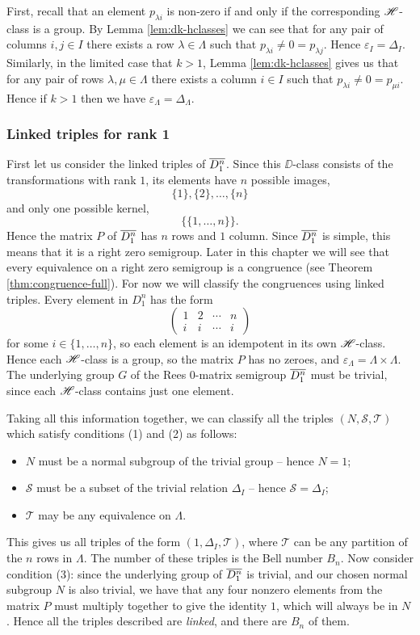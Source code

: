 First, recall that an element $p_{\lambda i}$ is non-zero if and only if the
corresponding $\mathrel{\mathscr{H}}$-class is a group.  By Lemma \ref{lem:dk-hclasses} we can see
that for any pair of columns $i,j \in I$ there exists a row
$\lambda \in \Lambda$ such that $p_{\lambda i} \neq 0 = p_{\lambda j}$.  Hence
$\varepsilon_I = \Delta_I$.  Similarly, in the limited case that $k>1$, Lemma
\ref{lem:dk-hclasses} gives us that for any pair of rows
$\lambda, \mu \in \Lambda$ there exists a column $i \in I$ such that
$p_{\lambda i} \neq 0 = p_{\mu i}$.  Hence if $k>1$ then we have
$\varepsilon_\Lambda = \Delta_\Lambda$.

\subsubsection{Linked triples for rank 1}
\label{sec:k1}
First let us consider the linked triples of $\overline{D_1^n}$.  Since this
$\DD$-class consists of the transformations with rank $1$, its elements have $n$
possible images,
$$\{1\}, \{2\}, \dots, \{n\}$$
and only one possible kernel,
$$\big\{\{1, \dots, n\}\big\}.$$
Hence the matrix $P$ of $\overline{D_1^n}$ has $n$ rows and $1$ column.  Since
$\overline{D_1^n}$ is simple, this means that it is a right zero semigroup.  Later in
this chapter we will see that every equivalence on a right zero semigroup is a
congruence (see Theorem \ref{thm:congruence-full}).  For now we will classify
the congruences using linked triples.  Every element in $D_1^n$ has the form
$$\begin{pmatrix}
  1 & 2 & \cdots & n \\
  i & i & \cdots & i
\end{pmatrix}$$ for some $i \in \{1, \dots, n\}$, so each element is an
idempotent in its own $\mathrel{\mathscr{H}}$-class.  Hence each $\mathrel{\mathscr{H}}$-class is a group, so the
matrix $P$ has no zeroes, and $\varepsilon_\Lambda = \Lambda \times \Lambda$.
The underlying group $G$ of the Rees 0-matrix semigroup $\overline{D_1^n}$ must be
trivial, since each $\mathrel{\mathscr{H}}$-class contains just one element.

Taking all this information together, we can classify all the triples $(N,
\mathcal{S}, \mathcal{T})$ which satisfy conditions (1) and (2) as follows:
\begin{itemize}
\item $N$ must be a normal subgroup of the trivial group -- hence $N = 1$;
\item $\mathcal{S}$ must be a subset of the trivial relation $\Delta_I$ -- hence
  $\mathcal{S} = \Delta_I$;
\item $\mathcal{T}$ may be any equivalence on $\Lambda$.
\end{itemize}
This gives us all triples of the form $(1,\Delta_I,\mathcal{T})$, where
$\mathcal{T}$ can be any partition of the $n$ rows in $\Lambda$.  The number of
these triples is the Bell number $B_n$.  Now consider condition (3): since the
underlying group of $\overline{D_1^n}$ is trivial, and our chosen normal subgroup $N$ is
also trivial, we have that any four nonzero elements from the matrix $P$ must
multiply together to give the identity $1$, which will always be in $N$.  Hence all the
triples described are \textit{linked}, and there are $B_n$ of them.

